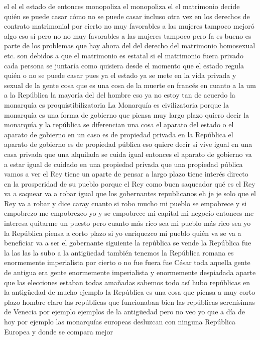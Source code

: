 el el el estado de entonces monopoliza el monopoliza el
el matrimonio decide quién se puede casar cómo no se puede casar incluso otra vez en los derechos de contrato matrimonial por cierto no muy favorables a las mujeres
tampoco mejoró algo eso sí pero no no muy favorables a las mujeres tampoco pero fa es bueno
es parte de los problemas que hay ahora del del derecho del matrimonio homosexual etc. son debidos a que el matrimonio es estatal
si el matrimonio fuera privado cada persona se juntaría como quisiera desde el momento que el estado regula quién o no se puede casar pues ya el estado
ya se mete en la vida privada y sexual de la gente cosa que es una cosa de la muerte en francés en cuanto a la um
a la República la mayoría del del hombre eso ya no estoy tan de acuerdo la monarquía es proquistibilizatoria
La Monarquía es civilizatoria
porque la monarquía es una forma de gobierno que piensa muy largo plazo quiero decir la monarquía y la república se diferencian
una cosa el aparato del estado o el aparato de gobierno en un caso es de propiedad privada en la República
el aparato de gobierno es de propiedad pública eso quiere decir
si vive igual en una casa privada que una alquilada se cuida igual
entonces el aparato de gobierno va a estar igual de cuidado en una propiedad privada que una propiedad pública
vamos a ver el Rey tiene un aparte de pensar a largo plazo tiene interés directo en la prosperidad de su pueblo
porque el Rey como buen saqueador qué es el Rey va a saquear va a robar
igual que los gobernantes republicanos eh je je solo que el Rey va a robar y dice caray cuanto
si robo mucho mi pueblo se empobrece y si empobrezo me empobrezco yo y se empobrece
mi capital mi negocio entonces me interesa quitarme un puesto pero cuanto más rico sea mi pueblo más rico sea yo
la República piensa a corto plazo si yo enriquezco mi pueblo quién va se va a beneficiar va a ser el gobernante siguiente
la república se vende la República fue la las las la subo a la antigüedad también tenemos la República romana
es enormemente imperialista por cierto o no fue fuera fue César
toda aquella gente de antigua era gente enormemente imperialista y enormemente despiadada aparte que las elecciones estaban todas amañadas
sabemos todo así hubo repúblicas en la antigüedad de mucho ejemplo la República es una cosa que piensa a muy corto plazo
hombre claro las repúblicas que funcionaban bien las repúblicas serenísimas de Venecia por ejemplo ejemplos de la antigüedad pero no veo yo que a día de hoy por ejemplo
las monarquías europeas desluzcan con ninguna República Europea y donde se compara mejor
